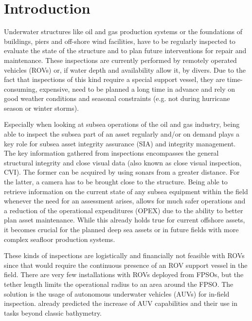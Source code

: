 \documentclass[conference]{IEEEtran}
\begin{document}
\IEEEpeerreviewmaketitle

\section{Introduction}

Underwater structures like oil and gas production systems or the foundations of buildings,
piers and off-shore wind facilities, have to be regularly inspected to evaluate the state
of the structure and to plan future interventions for repair and maintenance. These
inspections are currently performed by remotely operated vehicles (ROVs) or, if water depth and
availability allow it, by divers. Due to the fact that inspections of this kind require a
special support vessel, they are time-consuming, expensive, need to be planned a long time
in advance and rely on good weather conditions and seasonal constraints (e.g. not during
hurricane season or winter storms).

Especially when looking at subsea operations of the oil and gas industry, being able
to inspect the subsea part of an asset regularly and/or on demand plays a key role for
subsea asset integrity assurance (SIA) and integrity management. The key information gathered from inspections encompasses the general structural integrity and close visual data
(also known as close visual inspection, CVI). The former can be acquired by using sonars
from a greater distance. For the latter, a camera has to be brought close to the structure.
Being able to retrieve information on the current state of any subsea equipment within the
field whenever the need for an assessment arises, allows for much safer operations and a
reduction of the operational expenditures (OPEX) due to the ability to better plan asset
maintenance. While this already holds true for current offshore assets, it becomes crucial
for the planned deep sea assets or in future fields with more complex seafloor production
systems.

These kinds of inspections are logistically and financially not feasible with
ROVs since that would require the continuous presence of an ROV support vessel in the
field. There are very few installations with ROVs deployed from FPSOs, but the tether length 
limits the operational radius to an area around the FPSO. The
solution is the usage of autonomous underwater vehicles (AUVs) for in-field inspection.
\cite{gamechanger07} already predicted the increase of AUV capabilities and their use in
tasks beyond classic bathymetry.
\end{document}
